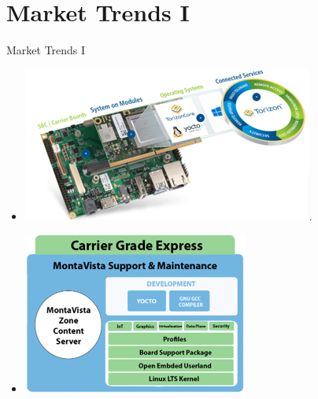 
\section{Market Trends I}
\begin{frame}{Market Trends I}
  \begin{itemize}
    \item \centering \includegraphics[scale=0.5]{trainingmaterials/rpibasics/torizon-hw.png}.
    \item \includegraphics[scale=0.5]{trainingmaterials/rpibasics/Montavista.png}
  \end{itemize}
\end{frame}


